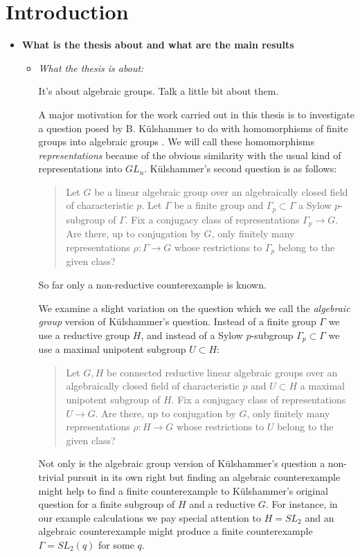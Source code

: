 
\chapter{Introduction}
\label{Chapter1}

\begin{itemize}
	\item[] \textbf{What is the thesis about and what are the main results}
	\begin{itemize}
		\item \emph{What the thesis is about:}
		
		
		It's about algebraic groups. Talk a little bit about them.
		
		A major motivation for the work carried out in this thesis is to investigate a question posed by B. K\"ulshammer to do with homomorphisms of finite groups into algebraic groups \cite{weil1964remarks}. We will call these homomorphisms \emph{representations} because of the obvious similarity with the usual kind of representations into $GL_n$. K\"ulshammer's second question is as follows:
		\begin{quote}
		Let $G$ be a linear algebraic group over an algebraically closed field of characteristic $p$. Let $\Gamma$ be a finite group and $\Gamma_p\subset\Gamma$ a Sylow $p$-subgroup of $\Gamma$. Fix a conjugacy class of representations $\Gamma_p\rightarrow G$. Are there, up to conjugation by $G$, only finitely many representations $\rho:\Gamma\rightarrow G$ whose restrictions to $\Gamma_p$ belong to the given class?
		\end{quote}
		
		
		So far only a non-reductive counterexample\cite{weil1964remarks} is known. 
		
		
		We examine a slight variation on the question which we call the \emph{algebraic group} version of K\"ulshammer's question. Instead of a finite group $\Gamma$ we use a reductive group $H$, and instead of a Sylow $p$-subgroup $\Gamma_p \subset \Gamma$ we use a maximal unipotent subgroup $U \subset H$:
		\begin{quote}
			Let $G,H$ be connected reductive linear algebraic groups over an algebraically closed field of characteristic $p$ and $U \subset H$ a maximal unipotent subgroup of $H$. Fix a conjugacy class of representations $U\rightarrow G$. Are there, up to conjugation by $G$, only finitely many representations $\rho:H\rightarrow G$ whose restrictions to $U$ belong to the given class?
		\end{quote}
		Not only is the algebraic group version of K\"ulshammer's question a non-trivial pursuit in its own right but finding an algebraic counterexample might help to find a finite counterexample to K\"ulshammer's original question for a finite subgroup of $H$ and a reductive $G$. For instance, in our example calculations we pay special attention to $H = SL_2$ and an algebraic counterexample might produce a finite counterexample $\Gamma = SL_2(q)$ for some $q$.
		

\end{itemize}
\end{itemize}
